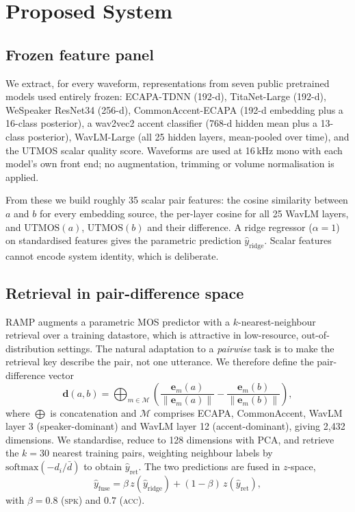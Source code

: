 \documentclass{article}
\begin{document}
\section{Proposed System}

\subsection{Frozen feature panel}

We extract, for every waveform, representations from seven public pretrained
models used entirely frozen: ECAPA-TDNN (192-d), TitaNet-Large (192-d),
WeSpeaker ResNet34 (256-d), CommonAccent-ECAPA \cite{commonaccent} (192-d
embedding plus a 16-class posterior), a wav2vec2 accent classifier (768-d hidden
mean plus a 13-class posterior), WavLM-Large \cite{wavlm} (all 25 hidden layers,
mean-pooled over time), and the UTMOS \cite{utmos} scalar quality score.
Waveforms are used at 16\,kHz mono with each model's own front end; no
augmentation, trimming or volume normalisation is applied.

From these we build roughly 35 scalar pair features: the cosine similarity
between $a$ and $b$ for every embedding source, the per-layer cosine for all 25
WavLM layers, and $\mathrm{UTMOS}(a)$, $\mathrm{UTMOS}(b)$ and their difference.
A ridge regressor ($\alpha=1$) on standardised features gives the parametric
prediction $\hat{y}_{\text{ridge}}$. Scalar features cannot encode system
identity, which is deliberate.

\subsection{Retrieval in pair-difference space}

RAMP \cite{ramp} augments a parametric MOS predictor with a $k$-nearest-neighbour
retrieval over a training datastore, which is attractive in low-resource,
out-of-distribution settings. The natural adaptation to a \emph{pairwise} task is
to make the retrieval key describe the pair, not one utterance. We therefore
define the pair-difference vector
\begin{equation}
  \mathbf{d}(a,b) = \bigoplus_{m \in \mathcal{M}}
    \left( \frac{\mathbf{e}_m(a)}{\lVert \mathbf{e}_m(a)\rVert}
         - \frac{\mathbf{e}_m(b)}{\lVert \mathbf{e}_m(b)\rVert} \right),
\end{equation}
where $\bigoplus$ is concatenation and $\mathcal{M}$ comprises ECAPA,
CommonAccent, WavLM layer 3 (speaker-dominant) and WavLM layer 12
(accent-dominant), giving 2{,}432 dimensions. We standardise, reduce to 128
dimensions with PCA, and retrieve the $k=30$ nearest training pairs, weighting
neighbour labels by $\mathrm{softmax}(-d_i/\bar{d})$ to obtain
$\hat{y}_{\text{ret}}$. The two predictions are fused in $z$-space,
\begin{equation}
  \hat{y}_{\text{fuse}} = \beta\, z(\hat{y}_{\text{ridge}})
                        + (1-\beta)\, z(\hat{y}_{\text{ret}}),
\end{equation}
with $\beta=0.8$ (\textsc{spk}) and $0.7$ (\textsc{acc}).
\end{document}
